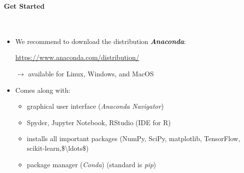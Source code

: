 \begin{frame}[c]
\textbf{\large Get
			Started}
~\\~\\~\\
\begin{itemize}
	\item
	We recommend to download the distribution \textbf{\emph{Anaconda}}:
	\begin{center}
		\url{https://www.anaconda.com/distribution/}
	\end{center}
\Vspace{0.5cm}
	
	$\rightarrow$ available for Linux, Windows, and MacOS
\end{itemize}
\Vspace{0.5cm}

\begin{itemize}
	
	\item
	Comes along with:
	
	\begin{itemize}
		
		\item
		graphical user interface (\emph{Anaconda Navigator})
		\item
		Spyder, Jupyter Notebook, RStudio (IDE for R)
		\item
		installs all important packages (NumPy, SciPy, matplotlib,
		TensorFlow, scikit-learn,\$\textbackslash{}ldots\$)
		\item
		package manager (\emph{Conda}) (standard is \emph{pip})
	\end{itemize}
\end{itemize}
\end{frame}


